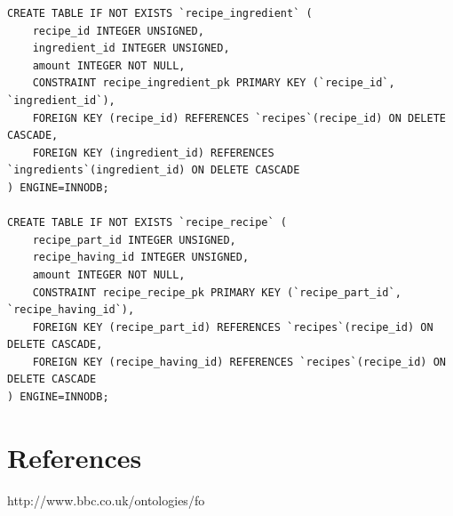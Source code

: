 \documentclass{article}
\begin{document}
\begin{lstlisting}[caption=Script of database]
CREATE TABLE IF NOT EXISTS `recipe_ingredient` (
    recipe_id INTEGER UNSIGNED,
    ingredient_id INTEGER UNSIGNED,
    amount INTEGER NOT NULL,
    CONSTRAINT recipe_ingredient_pk PRIMARY KEY (`recipe_id`, `ingredient_id`),
    FOREIGN KEY (recipe_id) REFERENCES `recipes`(recipe_id) ON DELETE CASCADE,
    FOREIGN KEY (ingredient_id) REFERENCES `ingredients`(ingredient_id) ON DELETE CASCADE
) ENGINE=INNODB;

CREATE TABLE IF NOT EXISTS `recipe_recipe` (
    recipe_part_id INTEGER UNSIGNED,
    recipe_having_id INTEGER UNSIGNED,
    amount INTEGER NOT NULL,
    CONSTRAINT recipe_recipe_pk PRIMARY KEY (`recipe_part_id`, `recipe_having_id`),
    FOREIGN KEY (recipe_part_id) REFERENCES `recipes`(recipe_id) ON DELETE CASCADE,
    FOREIGN KEY (recipe_having_id) REFERENCES `recipes`(recipe_id) ON DELETE CASCADE
) ENGINE=INNODB;

\end{lstlisting}
\section*{References}
http://www.bbc.co.uk/ontologies/fo
\end{document}
